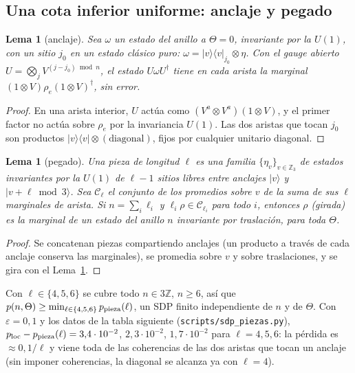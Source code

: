 \documentclass[11pt,a4paper]{article}
\newtheorem{lema}[teorema]{Lema}
\theoremstyle{definition}
\theoremstyle{remark}
\newcommand{\ket}[1]{|#1\rangle}
\newcommand{\bra}[1]{\langle #1|}
\newcommand{\eps}{\varepsilon}
\newcommand{\ploc}{p_{\mathrm{loc}}}
\newcommand{\scr}[1]{\texttt{scripts/#1}}
\begin{document}
\subsection{Una cota inferior uniforme: anclaje y pegado}

\begin{lema}[anclaje]\label{lem:anclaje}
Sea $\omega$ un estado del anillo a $\Theta=0$, invariante por la $U(1)$, con un sitio $j_0$ en un estado
clásico puro: $\omega=\ket v\bra v_{j_0}\otimes\eta$. Con el gauge abierto
$U=\bigotimes_jV^{(j-j_0)\bmod n}$, el estado $U\omega U^\dagger$ tiene en cada arista la marginal
$(1\otimes V)\rho_e(1\otimes V)^\dagger$, sin error.
\end{lema}

\begin{proof}
En una arista interior, $U$ actúa como $(V^a\otimes V^a)(1\otimes V)$, y el primer factor no actúa sobre
$\rho_e$ por la invariancia $U(1)$. Las dos aristas que tocan $j_0$ son productos
$\ket v\bra v\otimes(\text{diagonal})$, fijos por cualquier unitario diagonal.
\end{proof}

\begin{lema}[pegado]\label{lem:pegado}
Una \emph{pieza} de longitud $\ell$ es una familia $\{\eta_v\}_{v\in\mathbb Z_3}$ de estados invariantes
por la $U(1)$ de $\ell-1$ sitios libres entre anclajes $\ket v$ y $\ket{v+\ell\bmod3}$. Sea $\mathcal C_\ell$ el
conjunto de los promedios sobre $v$ de la suma de sus $\ell$ marginales de arista. Si $n=\sum_i\ell_i$ y
$\ell_i\rho\in \mathcal C_{\ell_i}$ para todo $i$, entonces $\rho$ (girada) es la marginal de un estado del anillo
$n$ invariante por traslación, para toda $\Theta$.
\end{lema}

\begin{proof}
Se concatenan piezas compartiendo anclajes (un producto a través de cada anclaje conserva las
marginales), se promedia sobre $v$ y sobre traslaciones, y se gira con el Lema~\ref{lem:anclaje}.
\end{proof}

Con $\ell\in\{4,5,6\}$ se cubre todo $n\in3\mathbb Z$, $n\ge6$, así que
$p(n,\Theta)\ge\min_{\ell\in\{4,5,6\}}p_{\rm pieza}(\ell)$, un SDP finito independiente de $n$ y de
$\Theta$. Con $\eps=0{,}1$ y los datos de la tabla siguiente (\scr{sdp\_piezas.py}),
$\ploc-p_{\rm pieza}(\ell)=3{,}4\cdot10^{-2}$, $2{,}3\cdot10^{-2}$, $1{,}7\cdot10^{-2}$ para
$\ell=4,5,6$: la pérdida es $\approx0{,}1/\ell$ y viene toda de las coherencias de las dos aristas que
tocan un anclaje (sin imponer coherencias, la diagonal se alcanza ya con $\ell=4$).
\end{document}
